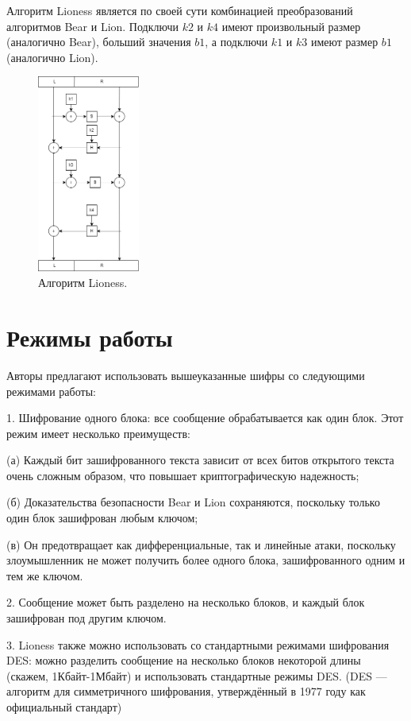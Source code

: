 \documentclass[12pt]{article}
\begin{document}
Алгоритм Lioness является по своей сути комбинацией преобразований алгоритмов Bear и Lion. Подключи $k2$ и $k4$ имеют произвольный размер (аналогично Bear), больший значения $b1$, а подключи $k1$ и $k3$ имеют размер $b1$ (аналогично Lion).

\vspace{5mm}
\begin{figure}
\centering
\includegraphics[width=0.3\textwidth]{Lioness.png}
\caption{\label{fig:Lioness}Алгоритм Lioness.}
\end{figure}

\section{Режимы работы}
Авторы предлагают использовать вышеуказанные шифры со следующими режимами работы:

\vspace{5mm}
1. Шифрование одного блока: все сообщение обрабатывается как один блок.
Этот режим имеет несколько преимуществ: 

(а) Каждый бит зашифрованного текста зависит от всех битов открытого текста очень сложным образом, что повышает криптографическую надежность; 

(б) Доказательства безопасности Bear и Lion сохраняются, поскольку только один блок зашифрован любым ключом; 

(в) Он предотвращает как дифференциальные, так и линейные атаки, поскольку злоумышленник не может получить более одного блока, зашифрованного одним и тем же ключом.

2. Сообщение может быть разделено на несколько блоков, и каждый блок зашифрован
под другим ключом.

3. Lioness также можно использовать со стандартными режимами шифрования DES: можно разделить сообщение на несколько блоков некоторой длины (скажем, 1Кбайт-1Мбайт) и использовать стандартные режимы DES. (DES — алгоритм для симметричного шифрования, утверждённый в 1977 году как официальный стандарт)
\end{document}
